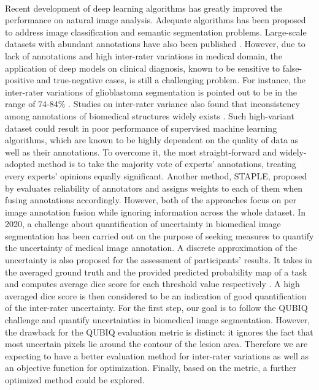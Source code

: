 \documentclass[12pt]{extarticle}
\begin{document}
\paragraph{}
Recent development of deep learning algorithms has greatly improved 
the performance on natural image analysis. 
Adequate algorithms has been proposed to address image classification and semantic
segmentation problems. Large-scale datasets with abundant annotations have also been
published \cite{nair_precup_arnold_arbel_2020}.
However, due to
lack of annotations and high inter-rater variations\cite{zhang2020disentangling}
in medical domain, the application of deep models on clinical diagnosis,
known to be sensitive to false-positive and true-negative cases, is still a challenging problem.
For instance, the inter-rater variations of glioblastoma segmentation
is pointed out to be in the range of 74-84\% \cite{6975210}.
Studies on inter-rater variance also found that
inconsistency among annotations of biomedical structures widely exists
\cite{Variability2019}\cite{interobserver2018}. Such high-variant dataset 
could result in poor performance of supervised machine learning algorithms,
which are known to be highly dependent on the quality of data as well as their annotations.
To overcome it, the most straight-forward and widely-adopted method 
is to take the majority vote of experts' annotations, treating every 
experts' opinions equally significant\cite{6975210}. Another method, STAPLE, proposed by \cite{STAPLE} 
evaluates reliability of annotators and assigns weights to each of them when 
fusing annotations accordingly. However, both of the approaches focus on per image annotation fusion
while ignoring information across the whole dataset\cite{zhang2020disentangling}.
In 2020, a challenge about quantification of uncertainty 
in biomedical image segmentation has been carried
out on the purpose of seeking measures to quantify the uncertainty of 
medical image annotation. A discrete approximation of the uncertainty is also
proposed for the assessment of participants' results. It
takes in the averaged ground truth and the provided predicted probability map of a task
and computes average dice score for each threshold value respectively 
\cite{qubiq}. 
A high averaged dice score is then considered to be an indication of 
good quantification of the inter-rater uncertainty.
For the first step, our goal is to follow the QUBIQ challenge and quantify 
uncertainties in biomedical image segmentation. 
However, the drawback for the QUBIQ evaluation metric is distinct: it 
ignores the fact that most uncertain pixels lie around 
the contour of the lesion area. Therefore we are expecting to have a
better evaluation method for inter-rater variations as well as an objective function for 
optimization. Finally, based on the metric, a further
optimized method could be explored.
\end{document}
